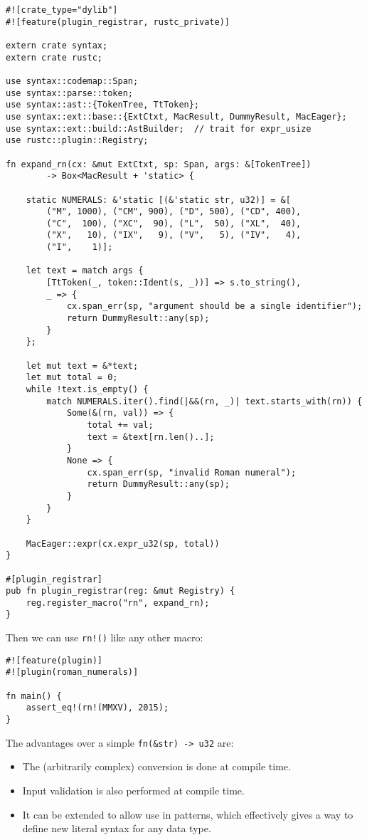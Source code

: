 \documentclass[a4paper,]{book}
\providecommand{\tightlist}{%
  \setlength{\itemsep}{0pt}\setlength{\parskip}{0pt}}
\begin{document}
\begin{verbatim}
#![crate_type="dylib"]
#![feature(plugin_registrar, rustc_private)]

extern crate syntax;
extern crate rustc;

use syntax::codemap::Span;
use syntax::parse::token;
use syntax::ast::{TokenTree, TtToken};
use syntax::ext::base::{ExtCtxt, MacResult, DummyResult, MacEager};
use syntax::ext::build::AstBuilder;  // trait for expr_usize
use rustc::plugin::Registry;

fn expand_rn(cx: &mut ExtCtxt, sp: Span, args: &[TokenTree])
        -> Box<MacResult + 'static> {

    static NUMERALS: &'static [(&'static str, u32)] = &[
        ("M", 1000), ("CM", 900), ("D", 500), ("CD", 400),
        ("C",  100), ("XC",  90), ("L",  50), ("XL",  40),
        ("X",   10), ("IX",   9), ("V",   5), ("IV",   4),
        ("I",    1)];

    let text = match args {
        [TtToken(_, token::Ident(s, _))] => s.to_string(),
        _ => {
            cx.span_err(sp, "argument should be a single identifier");
            return DummyResult::any(sp);
        }
    };

    let mut text = &*text;
    let mut total = 0;
    while !text.is_empty() {
        match NUMERALS.iter().find(|&&(rn, _)| text.starts_with(rn)) {
            Some(&(rn, val)) => {
                total += val;
                text = &text[rn.len()..];
            }
            None => {
                cx.span_err(sp, "invalid Roman numeral");
                return DummyResult::any(sp);
            }
        }
    }

    MacEager::expr(cx.expr_u32(sp, total))
}

#[plugin_registrar]
pub fn plugin_registrar(reg: &mut Registry) {
    reg.register_macro("rn", expand_rn);
}
\end{verbatim}

Then we can use \texttt{rn!()} like any other macro:

\begin{verbatim}
#![feature(plugin)]
#![plugin(roman_numerals)]

fn main() {
    assert_eq!(rn!(MMXV), 2015);
}
\end{verbatim}

The advantages over a simple \texttt{fn(\&str)\ -\textgreater{}\ u32}
are:

\begin{itemize}
\tightlist
\item
  The (arbitrarily complex) conversion is done at compile time.
\item
  Input validation is also performed at compile time.
\item
  It can be extended to allow use in patterns, which effectively gives a
  way to define new literal syntax for any data type.
\end{itemize}
\end{document}
